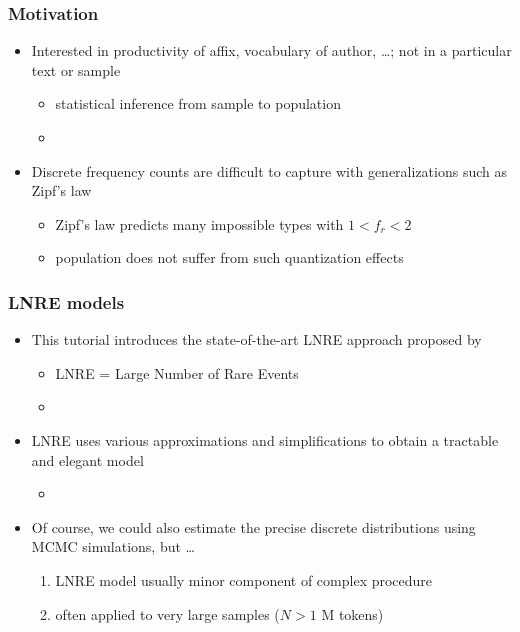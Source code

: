 \documentclass[t]{beamer} %
\begin{document}
\begin{frame}
  \frametitle{Motivation}

  \begin{itemize}
  \item Interested in productivity of affix, vocabulary of author, \ldots; not in a particular text or sample\\
    \begin{itemize}
    \item[\hand] statistical inference from sample to population
    \item[]
    \end{itemize}
  \item Discrete frequency counts are difficult to capture with generalizations such as Zipf's law
    \begin{itemize}
    \item Zipf's law predicts many impossible types with $1 < f_r < 2$
    \item[\hand] population does not suffer from such quantization effects
    \end{itemize}
  \end{itemize}
\end{frame}

\begin{frame}
  \frametitle{LNRE models}

  \begin{itemize}
  \item This tutorial introduces the state-of-the-art LNRE approach proposed by \citet{Baayen:01}
    \begin{itemize}
    \item LNRE = Large Number of Rare Events
    \item[]
    \end{itemize}
  \item LNRE uses various approximations and simplifications to obtain a tractable and elegant model
    \begin{itemize}
    \item[]
    \end{itemize}
  \item Of course, we could also estimate the precise discrete distributions using MCMC simulations, but \ldots
    \begin{enumerate}
    \item LNRE model usually minor component of complex procedure
    \item often applied to very large samples ($N > 1$ M tokens)
    \end{enumerate}
  \end{itemize}
\end{frame}
\end{document}
